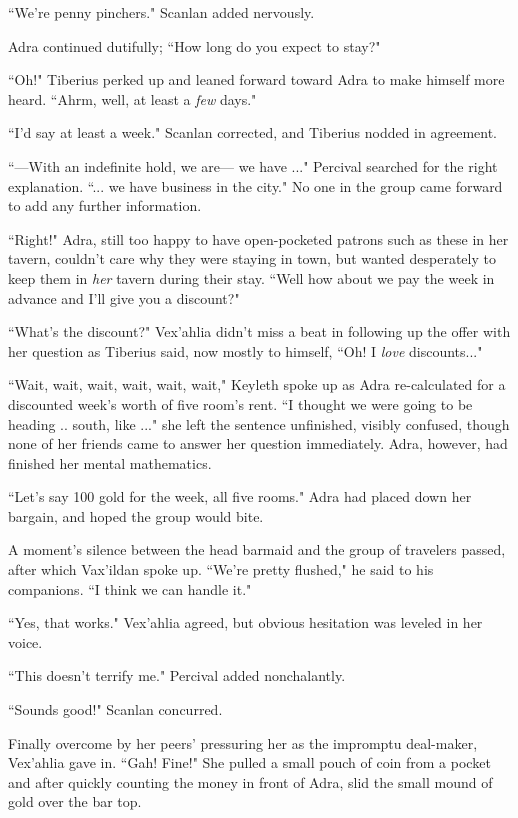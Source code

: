 ``We're penny pinchers." Scanlan added nervously.

Adra continued dutifully; ``How long do you expect to stay?"

``Oh!" Tiberius perked up and leaned forward toward Adra to make himself more heard. ``Ahrm, well, at least a \textit{few} days."

``I'd say at least a week." Scanlan corrected, and Tiberius nodded in agreement.

``---With an indefinite hold, we are--- we have ..." Percival searched for the right explanation. ``... we have business in the city." No one in the group came forward to add any further information.

``Right!" Adra, still too happy to have open-pocketed patrons such as these in her tavern, couldn't care why they were staying in town, but wanted desperately to keep them in \textit{her} tavern during their stay. ``Well how about we pay the week in advance and I'll give you a discount?"

``What's the discount?" Vex'ahlia didn't miss a beat in following up the offer with her question as Tiberius said, now mostly to himself, ``Oh! I \textit{love} discounts..."

``Wait, wait, wait, wait, wait, wait," Keyleth spoke up as Adra re-calculated for a discounted week's worth of five room's rent. ``I thought we were going to be heading .. south, like ..." she left the sentence unfinished, visibly confused, though none of her friends came to answer her question immediately. Adra, however, had finished her mental mathematics.

``Let's say 100 gold for the week, all five rooms." Adra had placed down her bargain, and hoped the group would bite.

A moment's silence between the head barmaid and the group of travelers passed, after which Vax'ildan spoke up. ``We're pretty flushed," he said to his companions. ``I think we can handle it."

``Yes, that works." Vex'ahlia agreed, but obvious hesitation was leveled in her voice.

``This doesn't terrify me." Percival added nonchalantly.

``Sounds good!" Scanlan concurred.

Finally overcome by her peers' pressuring her as the impromptu deal-maker, Vex'ahlia gave in. ``Gah! Fine!" She pulled a small pouch of coin from a pocket and after quickly counting the money in front of Adra, slid the small mound of gold over the bar top.


\newpage

